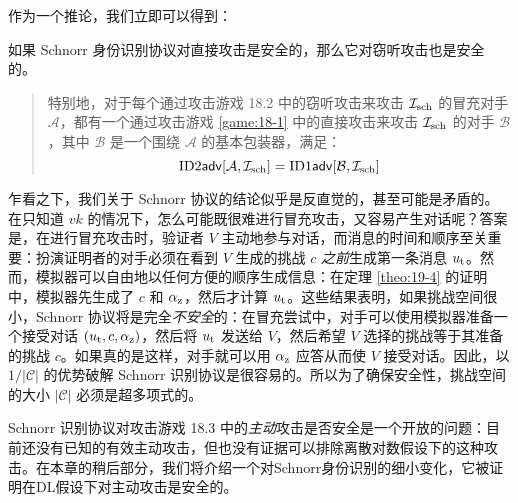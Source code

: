 作为一个推论，我们立即可以得到：

\begin{theorem}\label{theo:19-5}
	如果 Schnorr 身份识别协议对直接攻击是安全的，那么它对窃听攻击也是安全的。
	
	\begin{quote}
		特别地，对于每个通过攻击游戏 18.2 中的窃听攻击来攻击 $\mathcal{I}_{\rm sch}$ 的冒充对手 $\mathcal{A}$，都有一个通过攻击游戏 \ref{game:18-1} 中的直接攻击来攻击 $\mathcal{I}_{\rm sch}$ 的对手 $\mathcal{B}$，其中 $\mathcal{B}$ 是一个围绕 $\mathcal{A}$ 的基本包装器，满足：
		$${\rm ID2\mathsf{adv}}[\mathcal{A},\mathcal{I}_{\rm sch}]=
		{\rm ID1\mathsf{adv}}[\mathcal{B},\mathcal{I}_{\rm sch}]$$
	\end{quote}
\end{theorem}

乍看之下，我们关于 Schnorr 协议的结论似乎是反直觉的，甚至可能是矛盾的。在只知道 $vk$ 的情况下，怎么可能既很难进行冒充攻击，又容易产生对话呢？答案是，在进行冒充攻击时，验证者 $V$ 主动地参与对话，而消息的时间和顺序至关重要：扮演证明者的对手必须在看到 $V$ 生成的挑战 $c$ \emph{之前}生成第一条消息 $u_{\rm t}$。然而，模拟器可以自由地以任何方便的顺序生成信息：在定理 \ref{theo:19-4} 的证明中，模拟器先生成了 $c$ 和 $\alpha_{\rm z}$，然后才计算 $u_{\rm t}$。这些结果表明，如果挑战空间很小，Schnorr 协议将是完全\emph{不安全}的：在冒充尝试中，对手可以使用模拟器准备一个接受对话 $(u_{\rm t},c,\alpha_{\rm z})$，然后将 $u_{\rm t}$ 发送给 $V$，然后希望 $V$ 选择的挑战等于其准备的挑战 $c$。如果真的是这样，对手就可以用 $\alpha_{\rm z}$ 应答从而使 $V$ 接受对话。因此，以 ${1}/{|\mathcal{C}|}$ 的优势破解 Schnorr 识别协议是很容易的。所以为了确保安全性，挑战空间的大小 $|\mathcal{C}|$ 必须是超多项式的。

Schnorr 识别协议对攻击游戏 18.3 中的\emph{主动}攻击是否安全是一个开放的问题：目前还没有已知的有效主动攻击，但也没有证据可以排除离散对数假设下的这种攻击。在本章的稍后部分，我们将介绍一个对Schnorr身份识别的细小变化，它被证明在DL假设下对主动攻击是安全的。
